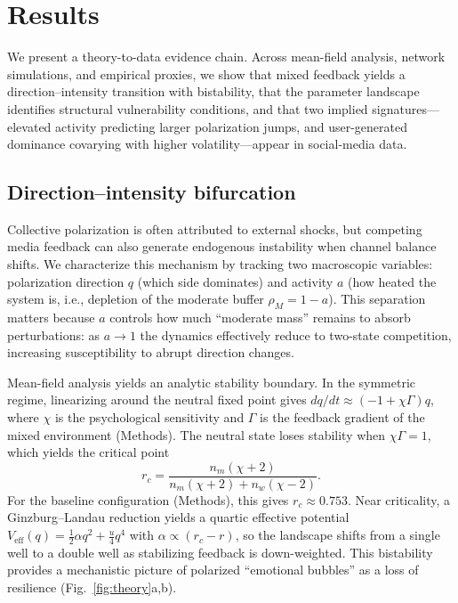 \documentclass[preprint,12pt]{elsarticle}
\begin{document}
\section{Results}
\label{sec:results}
\noindent We present a theory-to-data evidence chain. Across mean-field analysis, network simulations, and empirical proxies, we show that mixed feedback yields a direction--intensity transition with bistability, that the parameter landscape identifies structural vulnerability conditions, and that two implied signatures---elevated activity predicting larger polarization jumps, and user-generated dominance covarying with higher volatility---appear in social-media data.

\subsection{Direction--intensity bifurcation}
\label{sec:direction-intensity-bifurcation}
Collective polarization is often attributed to external shocks, but competing media feedback can also generate endogenous instability when channel balance shifts. We characterize this mechanism by tracking two macroscopic variables: polarization direction $q$ (which side dominates) and activity $a$ (how heated the system is, i.e., depletion of the moderate buffer $\rho_M=1-a$). This separation matters because $a$ controls how much ``moderate mass'' remains to absorb perturbations: as $a\to 1$ the dynamics effectively reduce to two-state competition, increasing susceptibility to abrupt direction changes.

Mean-field analysis yields an analytic stability boundary. In the symmetric regime, linearizing around the neutral fixed point gives $dq/dt\approx(-1+\chi\Gamma)q$, where $\chi$ is the psychological sensitivity and $\Gamma$ is the feedback gradient of the mixed environment (Methods). The neutral state loses stability when $\chi\Gamma=1$, which yields the critical point
\begin{equation}
r_c=\frac{n_m(\chi+2)}{n_m(\chi+2)+n_w(\chi-2)}.
\label{eq:rc}
\end{equation}
For the baseline configuration (Methods), this gives $r_c\approx 0.753$. Near criticality, a Ginzburg--Landau reduction yields a quartic effective potential $V_{\text{eff}}(q)=\tfrac{1}{2}\alpha q^2+\tfrac{u}{4}q^4$ with $\alpha\propto(r_c-r)$, so the landscape shifts from a single well to a double well as stabilizing feedback is down-weighted. This bistability provides a mechanistic picture of polarized ``emotional bubbles'' as a loss of resilience (Fig.~\ref{fig:theory}a,b).
\end{document}
